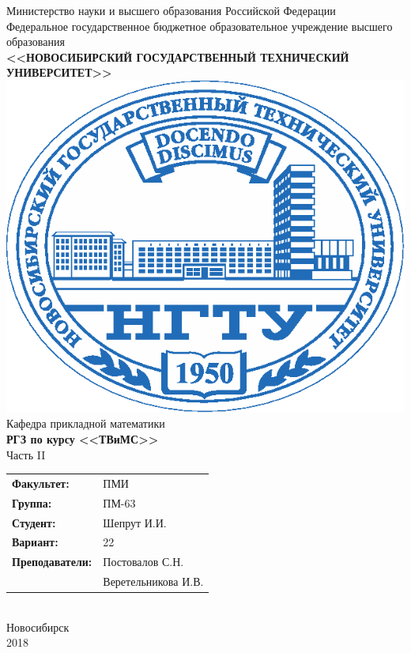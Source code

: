 \documentclass[12pt]{article}
\begin{document}
\begin{center}
\hfill \break
{\Large Министерство науки и высшего образования Российской Федерации}\\
\hfill \break
{\large Федеральное государственное бюджетное образовательное учреждение высшего образования}\\ 
{\normalsize\textbf{<<НОВОСИБИРСКИЙ ГОСУДАРСТВЕННЫЙ ТЕХНИЧЕСКИЙ УНИВЕРСИТЕТ>>}}\\
\hfill \break
\includegraphics{nstu_logo.eps}\\
{\large Кафедра прикладной математики}\\
\hfill \break
\hfill \break
\hfill \break
{\Large\textbf{РГЗ по курсу <<ТВиМС>>}}\\
\hfill \break 
{\Large Часть II}\\
\hfill \break
\hfill \break
\hfill \break
\hfill \break
\hfill \break
\begin{tabu}{ll}
\textbf{Факультет:} & ПМИ \\
\textbf{Группа:} & ПМ-63 \\
\textbf{Студент:} & Шепрут И.И. \\
\textbf{Вариант:} & 22 \\
\textbf{Преподаватели:} & Постовалов С.Н.\\
&Веретельникова И.В. \\
\end{tabu} \\
\hfill \break
\hfill \break
\hfill \break
\hfill \break
\hfill \break
\hfill \break
\hfill \break
{\large Новосибирск\\2018}
\end{center}
\thispagestyle{empty}
\newpage 
\setcounter{page}{1}


\end{document}
